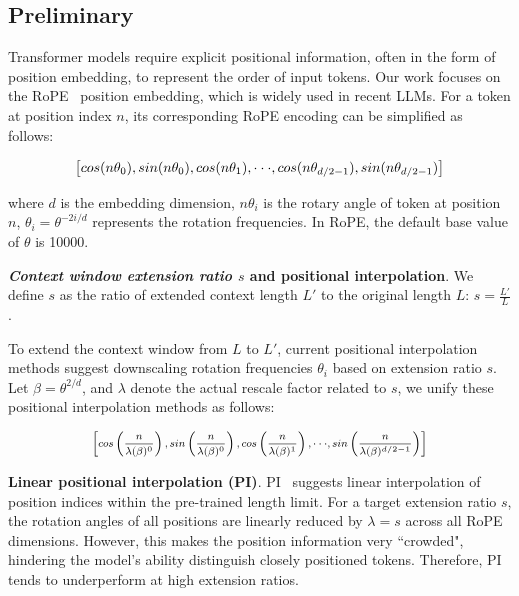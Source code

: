 \subsection{Preliminary}

Transformer models require explicit positional information, often in the form of position embedding, to represent the order of input tokens. Our work focuses on the RoPE~\cite{rope} position embedding, which is widely used in recent  LLMs. For a token at position index $n$, its corresponding RoPE encoding can be simplified as follows:

\begin{equation}
		\fontsize{7.8}{7.8} \selectfont
	\label{eq:rope}
	\left[ cos(n\theta_0), sin(n\theta_0), cos(n\theta_1), \cdot\cdot\cdot, cos(n\theta_{d/2-1}), sin(n\theta_{d/2-1}) \right]   
\end{equation}

where $d$ is the embedding dimension, 
 $n\theta_i$ is the rotary angle of token at position $n$, 
$\theta_i=\theta^{-2i/d}$ represents the rotation frequencies. In RoPE, the default base value of $\theta$ is 10000. 

\textbf{\emph{Context window extension ratio $s$} and positional interpolation}. We define $s$ as  the ratio of extended context length $L'$ to the original length $L$: $s=\frac{L'}{L}$. 

To extend the context window from $L$ to $L'$, current positional interpolation methods suggest downscaling rotation frequencies $\theta_i$ based on extension ratio $s$. Let $\beta=\theta^{2/d}$, and $\lambda$ denote the actual rescale factor related to $s$, we   unify these positional interpolation methods as follows:

\begin{equation}	
	\fontsize{7.5}{7.5} \selectfont
	\label{eq:unified_rope}
	\begin{aligned}
		\left[cos\left(\frac{n}{\lambda(\beta)^0}\right), sin \left(\frac{n}{\lambda(\beta)^0}\right), cos\left(\frac{n}{\lambda(\beta)^1}\right), \cdot\cdot\cdot,  sin \left(\frac{n}{\lambda(\beta)^{d/2-1}}\right) \right]   
	\end{aligned}
\end{equation}

\textbf{Linear positional interpolation (PI)}. PI~\cite{pi}  suggests linear interpolation of position indices within the pre-trained length limit. For a target extension ratio $s$, the rotation angles of all positions are linearly reduced by $\lambda=s$  across all RoPE dimensions. However, this makes the position information very ``crowded", hindering the model's ability distinguish closely positioned tokens. Therefore, PI tends to underperform at high extension ratios.

